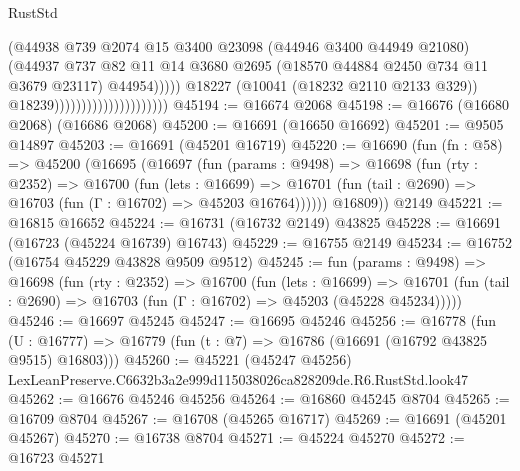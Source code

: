 \begin{lexlean}{RustStd}
\begin{coremodule}
                                                    (@44938
                                                      @739
                                                      @2074
                                                      @15
                                                      @3400
                                                      @23098
                                                      (@44946 @3400 @44949 @21080)
                                                      (@44937
                                                        @737
                                                        @82
                                                        @11
                                                        @14
                                                        @3680
                                                        @2695
                                                        (@18570 @44884 @2450 @734 @11 @3679 @23117)
                                                        @44954)))))
                                              @18227
                                              (@10041 (@18232 @2110 @2133 @329))
                                              @18239)))))))))))))))))))))
@45194 := @16674 @2068
@45198 := @16676 (@16680 @2068) (@16686 @2068)
@45200 := @16691 (@16650 @16692)
@45201 := @9505 @14897
@45203 := @16691 (@45201 @16719)
@45220 := @16690
    (fun (fn : @58) =>
    @45200
      (@16695
        (@16697
          (fun (params : @9498) =>
          @16698
            (fun (rty : @2352) =>
            @16700
              (fun (lets : @16699) =>
              @16701 (fun (tail : @2690) => @16703 (fun (Γ : @16702) => @45203 @16764))))))
        @16809))
    @2149
@45221 := @16815 @16652
@45224 := @16731 (@16732 @2149) @43825
@45228 := @16691 (@16723 (@45224 @16739) @16743)
@45229 := @16755 @2149
@45234 := @16752 (@16754 @45229 @43828 @9509 @9512)
@45245 := fun (params : @9498) =>
  @16698
    (fun (rty : @2352) =>
    @16700
      (fun (lets : @16699) =>
      @16701 (fun (tail : @2690) => @16703 (fun (Γ : @16702) => @45203 (@45228 @45234)))))
@45246 := @16697 @45245
@45247 := @16695 @45246
@45256 := @16778
    (fun (U : @16777) => @16779 (fun (t : @7) => @16786 (@16691 (@16792 @43825 @9515) @16803)))
@45260 := @45221 (@45247 @45256) LexLeanPreserve.C6632b3a2e999d115038026ca828209de.R6.RustStd.look47
@45262 := @16676 @45246 @45256
@45264 := @16860 @45245 @8704
@45265 := @16709 @8704
@45267 := @16708 (@45265 @16717)
@45269 := @16691 (@45201 @45267)
@45270 := @16738 @8704
@45271 := @45224 @45270
@45272 := @16723 @45271

\end{coremodule}
\end{lexlean}
